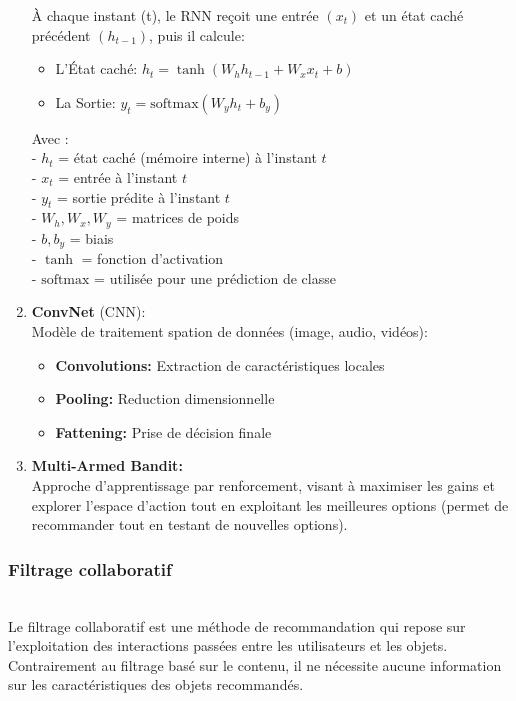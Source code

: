 \documentclass{article}
\begin{document}
\begin{enumerate}
          À chaque instant (t), le RNN reçoit une entrée \((x_t)\) et un état caché précédent \((h_{t-1})\), puis il calcule:
          \begin{itemize}
              \item L'État caché: \(h_t = \tanh(W_h h_{t-1} + W_x x_t + b)\)
              \item  La Sortie: \(y_t = \text{softmax}(W_y h_t + b_y)\)
          \end{itemize}
          Avec :\\
          - \( h_t \) = état caché (mémoire interne) à l’instant \( t \)\\
          - \( x_t \) = entrée à l’instant \( t \)\\
          - \( y_t \) = sortie prédite à l’instant \( t \)\\
          - \( W_h, W_x, W_y \) = matrices de poids\\
          - \( b, b_y \) = biais\\
          - \( \tanh \) = fonction d’activation\\
          - \( \text{softmax} \) = utilisée pour une prédiction de classe\\

    \item \textbf{ConvNet} (CNN):\\
          Modèle de traitement spation de données (image, audio, vidéos):
          \begin{itemize}
              \item \textbf{Convolutions:} Extraction de caractéristiques locales
              \item \textbf{Pooling:} Reduction dimensionnelle
              \item \textbf{Fattening:} Prise de décision finale
          \end{itemize}

    \item \textbf{Multi-Armed Bandit: }\\
          Approche d'apprentissage par renforcement, visant à maximiser les gains et explorer l'espace d'action tout en exploitant les meilleures options (permet de recommander tout en testant de nouvelles options).


\end{enumerate}

\subsubsection{Filtrage collaboratif}
$ $\\
Le filtrage collaboratif est une méthode de recommandation qui repose sur l’exploitation des interactions passées entre les utilisateurs
et les objets.
Contrairement au filtrage basé sur le contenu, il ne nécessite aucune information sur les caractéristiques des objets recommandés.
\end{document}

